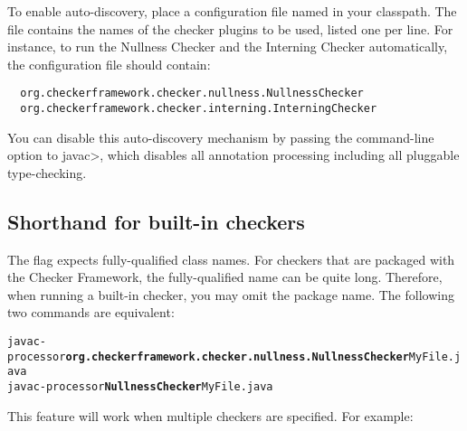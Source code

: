 \begin{sloppypar}
To enable auto-discovery, place a configuration file named
in your classpath.  The file contains the names of the checker plugins to
be used, listed one per line.  For instance, to run the Nullness Checker and the
Interning Checker automatically, the configuration file should contain:
\end{sloppypar}

\begin{smaller}
\begin{Verbatim}
  org.checkerframework.checker.nullness.NullnessChecker
  org.checkerframework.checker.interning.InterningChecker
\end{Verbatim}
\end{smaller}

You can disable this auto-discovery mechanism by passing the
 command-line option to \<javac>, which disables all
annotation processing including all pluggable type-checking.


\subsection{Shorthand for built-in checkers \label{shorthand-for-checkers}}
The  flag expects fully-qualified class names.
For checkers that are packaged with the Checker Framework, the fully-qualified
name can be quite long.  Therefore, when running a built-in checker, you may 
omit the package name.  The following two commands are equivalent: 

\begin{alltt}
  javac -processor \textbf{org.checkerframework.checker.nullness.NullnessChecker} MyFile.java
  javac -processor \textbf{NullnessChecker} MyFile.java
\end{alltt}

This feature will work when multiple checkers are specified.
For example:

